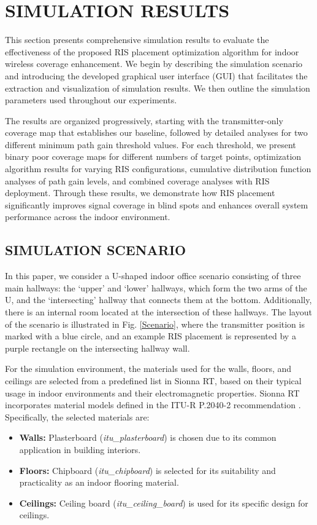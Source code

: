 \documentclass{IEEEoj}
\begin{document}
\section{SIMULATION RESULTS} \label{sec:results}
This section presents comprehensive simulation results to evaluate the effectiveness of the proposed RIS placement optimization algorithm for indoor wireless coverage enhancement. We begin by describing the simulation scenario and introducing the developed graphical user interface (GUI) that facilitates the extraction and visualization of simulation results. We then outline the simulation parameters used throughout our experiments.

The results are organized progressively, starting with the transmitter-only coverage map that establishes our baseline, followed by detailed analyses for two different minimum path gain threshold values. For each threshold, we present binary poor coverage maps for different numbers of target points, optimization algorithm results for varying RIS configurations, cumulative distribution function analyses of path gain levels, and combined coverage analyses with RIS deployment. Through these results, we demonstrate how RIS placement significantly improves signal coverage in blind spots and enhances overall system performance across the indoor environment.

\subsection{SIMULATION SCENARIO}
In this paper, we consider a U-shaped indoor office scenario consisting of three main hallways: the `upper' and `lower' hallways, which form the two arms of the U, and the `intersecting' hallway that connects them at the bottom. Additionally, there is an internal room located at the intersection of these hallways. The layout of the scenario is illustrated in Fig. \ref{Scenario}, where the transmitter position is marked with a blue circle, and an example RIS placement is represented by a purple rectangle on the intersecting hallway wall.

For the simulation environment, the materials used for the walls, floors, and ceilings are selected from a predefined list in Sionna RT, based on their typical usage in indoor environments and their electromagnetic properties. Sionna RT incorporates material models defined in the ITU-R P.2040-2 recommendation \cite{ITU}. Specifically, the selected materials are:  
\begin{itemize}
	\item \textbf{Walls:} Plasterboard (\textit{itu\_plasterboard}) is chosen due to its common application in building interiors.
	\item \textbf{Floors:} Chipboard (\textit{itu\_chipboard}) is selected for its suitability and practicality as an indoor flooring material.
	\item \textbf{Ceilings:} Ceiling board (\textit{itu\_ceiling\_board}) is used for its specific design for ceilings.
\end{itemize}
\end{document}
